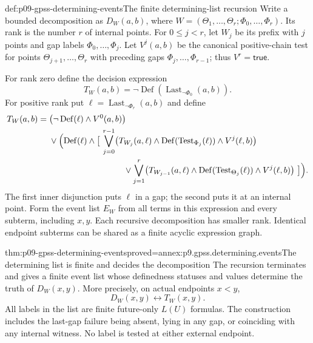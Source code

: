 \begin{hbdefinition}{def:p09-gpss-determining-events}{The finite determining-list recursion}
Write a bounded decomposition as
\(D_W(a,b)\), where
\(W=(\Theta_1,\ldots,\Theta_r;\Phi_0,\ldots,\Phi_r)\).
Its rank is the number \(r\) of internal points. For \(0\leq j<r\),
let \(W_j\) be its prefix with \(j\) points and gap labels
\(\Phi_0,\ldots,\Phi_j\). Let \(V^{j}(a,b)\) be the
canonical positive-chain test for points \(\Theta_{j+1},\ldots,
\Theta_r\) with preceding gaps \(\Phi_j,\ldots,\Phi_{r-1}\);
thus \(V^{r}=\mathsf{true}\).

For rank zero define the decision expression
\[
 T_W(a,b)=\neg\operatorname{Def}
                    (\operatorname{Last}_{\neg\Phi_0}(a,b)).
\]
For positive rank put \(\ell=\operatorname{Last}_{\neg\Phi_r}(a,b)\)
and define
\[
\begin{aligned}
 T_W(a,b)={}&
  \bigl(\neg\operatorname{Def}(\ell)\land V^0(a,b)\bigr)\\
 &\lor\Bigl(\operatorname{Def}(\ell)\land
        \bigl[\ \bigvee_{j=0}^{r-1}
          \bigl(T_{W_j}(a,\ell)\land
             \operatorname{Def}(\operatorname{Test}_{\Phi_j}(\ell))
             \land V^{j}(\ell,b)\bigr)\\
 &\hspace{31mm}\lor\bigvee_{j=1}^{r}
          \bigl(T_{W_{j-1}}(a,\ell)\land
             \operatorname{Def}(\operatorname{Test}_{\Theta_j}(\ell))
             \land V^{j}(\ell,b)\bigr)\ \bigr]\Bigr).
\end{aligned}
\]
The first inner disjunction puts \(\ell\) in a gap; the second
puts it at an internal point. Form the event list \(E_W\) from
all terms in this expression and every subterm, including \(x,y\).
Each recursive decomposition has smaller rank. Identical endpoint
subterms can be shared as a finite acyclic expression graph.
\end{hbdefinition}

\begin{hblemma}{thm:p09-gpss-determining-events}{proved=annex:p9.gpss.determining.events}{The determining list is finite and decides the decomposition}
The recursion terminates and gives a finite event list whose definedness
statuses and values determine the truth of \(D_W(x,y)\). More
precisely, on actual endpoints \(x<y\),
\[
                             D_W(x,y)\longleftrightarrow T_W(x,y).
\]
All labels in the list are finite future-only \(L(U)\) formulas.
The construction includes the last-gap failure being absent, lying
in any gap, or coinciding with any internal witness. No label is
tested at either external endpoint.
\end{hblemma}

